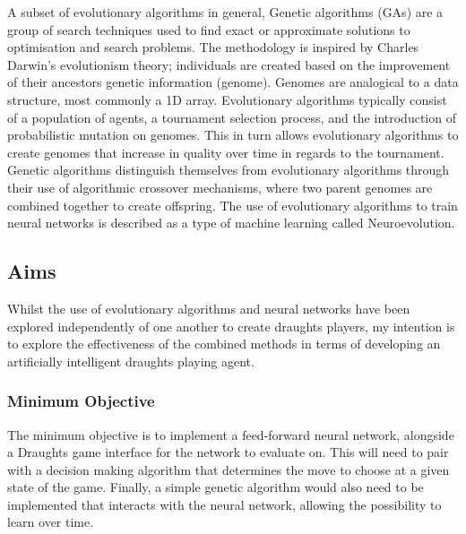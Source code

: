 \documentclass[12pt,a4paper]{article}
\begin{document}
    A subset of evolutionary algorithms in general, Genetic algorithms (GAs) are a group of search techniques used to find exact or approximate solutions to optimisation and search problems. The methodology is inspired by Charles Darwin's evolutionism theory; individuals are created based on the improvement of their ancestors genetic information (genome). Genomes are analogical to a data structure, most commonly a 1D array. Evolutionary algorithms typically consist of a population of agents, a tournament selection process, and the introduction of probabilistic mutation on genomes. This in turn allows evolutionary algorithms to create genomes that increase in quality over time in regards to the tournament. Genetic algorithms distinguish themselves from evolutionary algorithms through their use of algorithmic crossover mechanisms, where two parent genomes are combined together to create offspring. The use of evolutionary algorithms to train neural networks is described as a type of machine learning called Neuroevolution.

    \subsection{Aims}

    Whilst the use of evolutionary algorithms and neural networks have been explored independently of one another to create draughts players, my intention is to explore the effectiveness of the combined methods in terms of developing an artificially intelligent draughts playing agent. 

    \subsubsection{Minimum Objective}
        The minimum objective is to implement a feed-forward neural network, alongside a Draughts game interface for the network to evaluate on. This will need to pair with a decision making algorithm that determines the move to choose at a given state of the game. Finally, a simple genetic algorithm would also need to be implemented that interacts with the neural network, allowing the possibility to learn over time.
\end{document}
